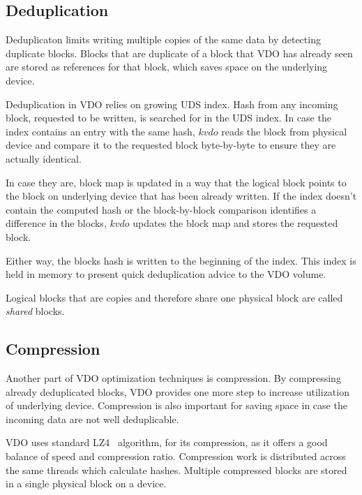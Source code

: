 \documentclass[
  color, %
  table, %
  lof,   %
  lot,   %
]{fithesis3}
\begin{document}
\subsection{Deduplication}
Deduplicaton limits writing multiple copies of the same data by detecting duplicate blocks. Blocks that are duplicate of a block that VDO has already seen are stored as references for that block, which saves space on the underlying device.

Deduplication in VDO relies on growing UDS index. Hash from any incoming block, requested to be written, is searched for in the UDS index. In case the index contains an entry with the same hash, $kvdo$ reads the block from physical device and compare it to the requested block byte-by-byte to ensure they are actually identical.

In case they are, block map is updated in a way that the logical block points to the block on underlying device that has been already written. If the index doesn't contain the computed hash or the block-by-block comparison identifies a difference in the blocks, $kvdo$ updates the block map and stores the requested block.

Either way, the blocks hash is written to the beginning of the index. This index is held in memory to present quick deduplication advice to the VDO volume.

Logical blocks that are copies and therefore share one physical block are called \emph{shared} blocks.

\subsection{Compression}
Another part of VDO optimization techniques is compression. By compressing already deduplicated blocks, VDO provides one more step to increase utilization of underlying device. Compression is also important for saving space in case the incoming data are not well deduplicable.


VDO uses standard LZ4~\cite{github:lz4} algorithm, for its compression, as it offers a good balance of speed and compression ratio. Compression work is distributed across the same threads which calculate hashes. Multiple compressed blocks are stored in a single physical block on a device.
\end{document}
